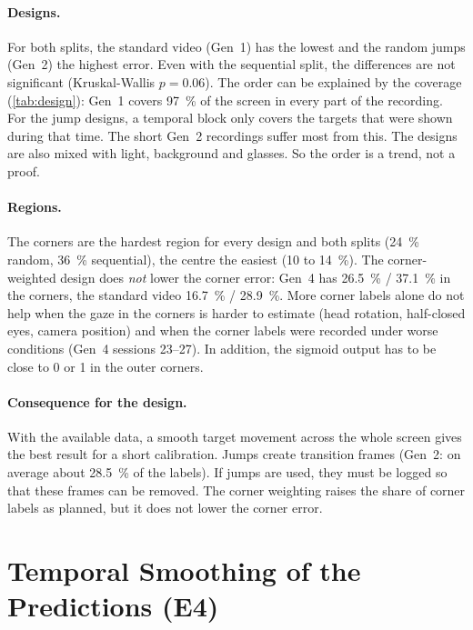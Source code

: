 \paragraph{Designs.} For both splits, the standard video (Gen~1) has the lowest
and the random jumps (Gen~2) the highest error. Even with the sequential split,
the differences are not significant (Kruskal-Wallis $p=0.06$). The order can be
explained by the coverage (\cref{tab:design}): Gen~1 covers \SI{97}{\percent}
of the screen in every part of the recording. For the jump designs, a temporal
block only covers the targets that were shown during that time. The short Gen~2
recordings suffer most from this. The designs are also mixed with light,
background and glasses. So the order is a trend, not a proof.

\paragraph{Regions.} The corners are the hardest region for every design and
both splits (\SI{24}{\percent} random, \SI{36}{\percent} sequential), the centre
the easiest (\SI{10}{} to \SI{14}{\percent}). The corner-weighted design does
\emph{not} lower the corner error: Gen~4 has \SI{26.5}{\percent} /
\SI{37.1}{\percent} in the corners, the standard video \SI{16.7}{\percent} /
\SI{28.9}{\percent}. More corner labels alone do not help when the gaze in the
corners is harder to estimate (head rotation, half-closed eyes, camera position)
and when the corner labels were recorded under worse conditions (Gen~4 sessions
23--27). In addition, the sigmoid output has to be close to 0 or 1 in the outer
corners.

\paragraph{Consequence for the design.} With the available data, a smooth target
movement across the whole screen gives the best result for a short calibration.
Jumps create transition frames (Gen~2: on average about \SI{28.5}{\percent} of the labels).
If jumps are used, they must be logged so that these frames can be removed. The
corner weighting raises the share of corner labels as planned, but it does not
lower the corner error.

\section{Temporal Smoothing of the Predictions (E4)}
\label{sec:smoothing}

